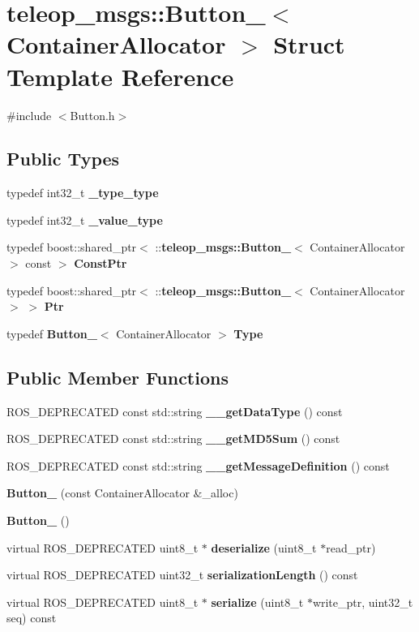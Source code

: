 \section{teleop\_\-msgs::Button\_\-$<$ ContainerAllocator $>$ Struct Template Reference}
\label{structteleop__msgs_1_1Button__}


{\ttfamily \#include $<$Button.h$>$}

\subsection*{Public Types}
\begin{DoxyCompactItemize}
\item 
typedef int32\_\-t {\bf \_\-type\_\-type}
\item 
typedef int32\_\-t {\bf \_\-value\_\-type}
\item 
typedef boost::shared\_\-ptr$<$ ::{\bf teleop\_\-msgs::Button\_\-}$<$ ContainerAllocator $>$ const  $>$ {\bf ConstPtr}
\item 
typedef boost::shared\_\-ptr$<$ ::{\bf teleop\_\-msgs::Button\_\-}$<$ ContainerAllocator $>$ $>$ {\bf Ptr}
\item 
typedef {\bf Button\_\-}$<$ ContainerAllocator $>$ {\bf Type}
\end{DoxyCompactItemize}
\subsection*{Public Member Functions}
\begin{DoxyCompactItemize}
\item 
ROS\_\-DEPRECATED const std::string {\bf \_\-\_\-getDataType} () const 
\item 
ROS\_\-DEPRECATED const std::string {\bf \_\-\_\-getMD5Sum} () const 
\item 
ROS\_\-DEPRECATED const std::string {\bf \_\-\_\-getMessageDefinition} () const 
\item 
{\bf Button\_\-} (const ContainerAllocator \&\_\-alloc)
\item 
{\bf Button\_\-} ()
\item 
virtual ROS\_\-DEPRECATED uint8\_\-t $\ast$ {\bf deserialize} (uint8\_\-t $\ast$read\_\-ptr)
\item 
virtual ROS\_\-DEPRECATED uint32\_\-t {\bf serializationLength} () const 
\item 
virtual ROS\_\-DEPRECATED uint8\_\-t $\ast$ {\bf serialize} (uint8\_\-t $\ast$write\_\-ptr, uint32\_\-t seq) const 
\end{DoxyCompactItemize}
